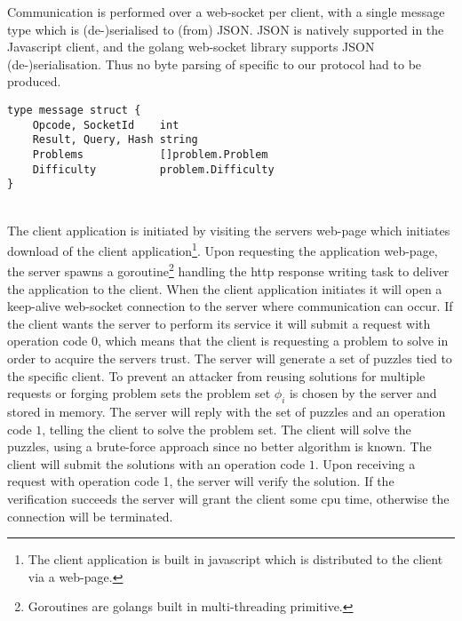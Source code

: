 Communication is performed over a web-socket per client, with a single message type which is (de-)serialised to (from) JSON. JSON is natively supported in the Javascript client, and the golang web-socket library supports JSON (de-)serialisation. Thus no byte parsing of specific to our protocol had to be produced.
\begin{verbatim}
type message struct {
	Opcode, SocketId    int
	Result, Query, Hash string
	Problems            []problem.Problem
	Difficulty          problem.Difficulty
}
\end{verbatim}
\\
The client application is initiated by visiting the servers web-page which initiates download of the client application\footnote{The client application is built in javascript which is distributed to the client via a web-page.}. Upon requesting the application web-page, the server spawns a goroutine\footnote{Goroutines are golangs built in multi-threading primitive.} handling the http response writing task to deliver the application to the client.
When the client application initiates it will open a keep-alive web-socket connection to the server where communication can occur. 
If the client wants the server to perform its service it will submit a request with operation code $0$, which means that the client is requesting a problem to solve in order to acquire the servers trust. The server will generate a set of puzzles tied to the specific client. To prevent an attacker from reusing solutions for multiple requests or forging problem sets the problem set $\phi_i$ is chosen by the server and stored in memory. The server will reply with the set of puzzles and an operation code $1$, telling the client to solve the problem set. The client will solve the puzzles, using a brute-force approach since no better algorithm is known. The client will submit the solutions with an operation code $1$. Upon receiving a request with operation code 1, the server will verify the solution. If the verification succeeds the server will grant the client some cpu time, otherwise the connection will be terminated.






